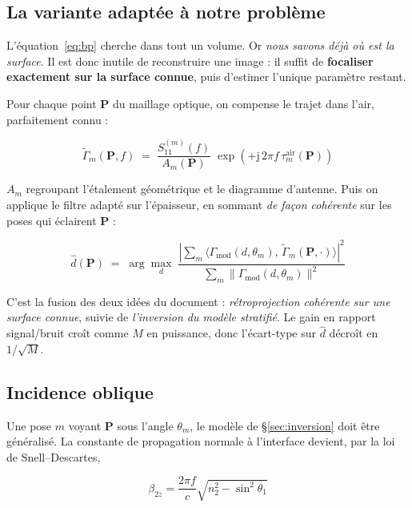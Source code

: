 \documentclass[11pt,a4paper]{article}
\newcommand{\jj}{\mathrm{j}}
\begin{document}
\subsection{La variante adaptée à notre problème}

L'équation~\eqref{eq:bp} cherche dans tout un volume. Or \emph{nous savons déjà
où est la surface}. Il est donc inutile de reconstruire une image : il suffit de
\textbf{focaliser exactement sur la surface connue}, puis d'estimer l'unique
paramètre restant.

Pour chaque point $\mathbf{P}$ du maillage optique, on compense le trajet dans
l'air, parfaitement connu :

\begin{equation}
\widetilde{\Gamma}_m(\mathbf{P},f) \;=\;
   \frac{S_{11}^{(m)}(f)}{A_m(\mathbf{P})}\;
   \exp\!\left(+\jj\,2\pi f\,\tau_m^{\text{air}}(\mathbf{P})\right)
\end{equation}

$A_m$ regroupant l'étalement géométrique et le diagramme d'antenne. Puis on
applique le filtre adapté sur l'épaisseur, en sommant \emph{de façon cohérente}
sur les poses qui éclairent $\mathbf{P}$ :

\begin{equation}
\boxed{\;
\hat d(\mathbf{P}) \;=\; \arg\max_{d}\;
   \frac{\left|\sum_{m} \big\langle
      \Gamma_{\text{mod}}(d,\theta_m),\,
      \widetilde{\Gamma}_m(\mathbf{P},\cdot)\big\rangle\right|^{2}}
        {\sum_{m}\big\|\Gamma_{\text{mod}}(d,\theta_m)\big\|^{2}}
\;}
\label{eq:sar-inv}
\end{equation}

C'est la fusion des deux idées du document : \emph{rétroprojection cohérente sur
une surface connue}, suivie de \emph{l'inversion du modèle stratifié}. Le gain
en rapport signal/bruit croît comme $M$ en puissance, donc l'écart-type sur
$\hat d$ décroît en $1/\sqrt{M}$.

\subsection{Incidence oblique}

Une pose $m$ voyant $\mathbf{P}$ sous l'angle $\theta_m$, le modèle de
\S\ref{sec:inversion} doit être généralisé. La constante de propagation normale
à l'interface devient, par la loi de Snell--Descartes,

\begin{equation}
\beta_{2z} = \frac{2\pi f}{c}\sqrt{n_2^{2} - \sin^{2}\theta_1}
\end{equation}
\end{document}
